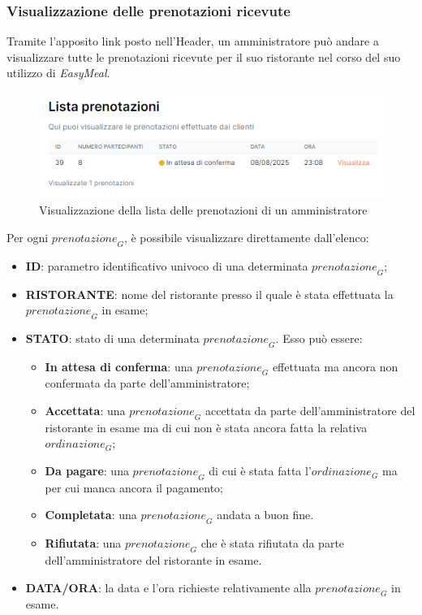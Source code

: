 \newpage
\subsubsection{Visualizzazione delle prenotazioni ricevute}
Tramite l'apposito link posto nell'Header, un amministratore può andare a visualizzare tutte le prenotazioni ricevute per il suo ristorante nel corso del suo utilizzo di \textit{EasyMeal}. 
\begin{figure}[H]
    \centering
    \includegraphics[width=0.6\linewidth]{img/lista_prenotazioni_admin.PNG}
    \caption{Visualizzazione della lista delle prenotazioni di un amministratore}
\end{figure}
Per ogni $\textit{prenotazione}_G$, è possibile visualizzare direttamente dall'elenco: 
\begin{itemize}
    \item \textbf{ID}: parametro identificativo univoco di una determinata $\textit{prenotazione}_G$;
    \item \textbf{RISTORANTE}: nome del ristorante presso il quale è stata effettuata la $\textit{prenotazione}_G$ in esame; 
    \item \textbf{STATO}: stato di una determinata $\textit{prenotazione}_G$. Esso può essere: 
    \begin{itemize}
        \item \textbf{In attesa di conferma}: una $\textit{prenotazione}_G$ effettuata ma ancora non confermata da parte dell'amministratore; 
        \item \textbf{Accettata}: una $\textit{prenotazione}_G$ accettata da parte dell'amministratore del ristorante in esame ma di cui non è stata ancora fatta la relativa $\textit{ordinazione}_G$; 
        \item \textbf{Da pagare}: una $\textit{prenotazione}_G$ di cui è stata fatta l'$\textit{ordinazione}_G$ ma per cui manca ancora il pagamento; 
        \item \textbf{Completata}: una $\textit{prenotazione}_G$ andata a buon fine.
        \item \textbf{Rifiutata}: una $\textit{prenotazione}_G$ che è stata rifiutata da parte dell'amministratore del ristorante in esame. 
    \end{itemize}
    \item \textbf{DATA/ORA}: la data e l'ora richieste relativamente alla $\textit{prenotazione}_G$ in esame. 
\end{itemize}
